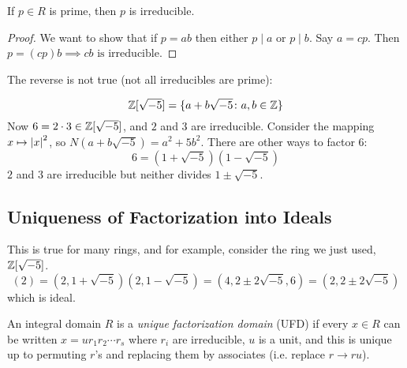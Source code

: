 \documentclass[a4paper,twoside,master.tex]{subfiles}
\begin{document}
\begin{claim}
    If $ p \in R $ is prime, then $ p $ is irreducible.
\end{claim}
\begin{proof}
    We want to show that if $ p = a b $ then either $ p\mid a $ or $ p\mid b $. Say $ a = c p $. Then $ p = (c p)b \implies c b \text{ is irreducible} $.
\end{proof}

The reverse is not true (not all irreducibles are prime):
\begin{ex}
    \begin{equation}
        \mathbb{Z}[\sqrt{-5}] = \{a + b \sqrt{-5}\colon a,b \in \mathbb{Z}\}
    \end{equation}
    Now $ 6 = 2 \cdot 3 \in \mathbb{Z}[\sqrt{-5}] $, and $ 2 $ and $ 3 $ are irreducible. Consider the mapping $ x\mapsto \abs{x}^2 $, so $ N(a + b \sqrt{-5}) = a^2 + 5 b^2 $. There are other ways to factor $ 6 $:
    \begin{equation}
        6 = (1+ \sqrt{-5})(1 - \sqrt{-5})
    \end{equation}
    $ 2 $ and $ 3 $ are irreducible but neither divides $ 1 \pm \sqrt{-5} $.
\end{ex}


\subsection{Uniqueness of Factorization into Ideals}
\label{sub:uniqueness_of_factorization_into_ideals}

This is true for many rings, and for example, consider the ring we just used, $ \mathbb{Z}[\sqrt{-5}] $.
\begin{equation}
    (2) = (2,1+ \sqrt{-5})(2, 1- \sqrt{-5}) = (4, 2\pm 2 \sqrt{-5},6) = (2,2\pm 2 \sqrt{-5})
\end{equation}
which is ideal.

\begin{definition}
    An integral domain $ R $ is a \textit{unique factorization domain} (UFD) if every $ x \in R $ can be written $ x = u r_1 r_2 \cdots r_s $ where $ r_i $ are irreducible, $ u $ is a unit, and this is unique up to permuting $ r $'s and replacing them by associates (i.e. replace $ r \to r u $). 
\end{definition}
\end{document}
